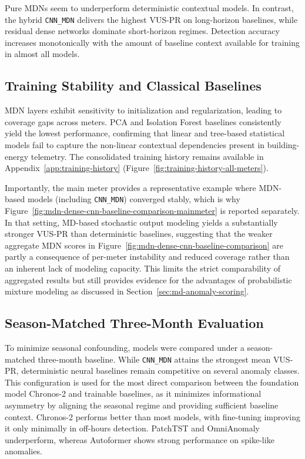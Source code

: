 Pure \ac{MDN}s seem to underperform deterministic contextual models. In
contrast, the hybrid \texttt{CNN\_\allowbreak MDN} delivers the highest \ac{VUS-PR} on
long-horizon baselines, while residual dense networks dominate short-horizon
regimes. Detection accuracy increases monotonically with the amount of baseline
context available for training in almost all models.

\subsection{Training Stability and Classical Baselines}
\label{subsec:training-stability-baselines}

\ac{MDN} layers exhibit sensitivity to initialization and regularization, leading to
coverage gaps across meters. \ac{PCA} and Isolation Forest baselines consistently yield
the lowest performance, confirming that linear and tree-based statistical models fail
to capture the non-linear contextual dependencies present in building-energy
telemetry. The consolidated training history remains available in
Appendix~\ref{app:training-history} (Figure~\ref{fig:training-history-all-meters}).

Importantly, the main meter provides a representative example where \ac{MDN}-based models (including \texttt{CNN\_\allowbreak MDN}) converged stably, which is why Figure~\ref{fig:mdn-dense-cnn-baseline-comparison-mainmeter} is reported separately. In that setting, \ac{MD}-based stochastic output modeling yields a substantially stronger \ac{VUS-PR} than deterministic baselines, suggesting that the weaker aggregate \ac{MDN} scores in Figure~\ref{fig:mdn-dense-cnn-baseline-comparison} are partly a consequence of per-meter instability and reduced coverage rather than an inherent lack of modeling capacity. This limits the strict comparability of aggregated results but still provides evidence for the advantages of probabilistic mixture modeling as discussed in Section~\ref{sec:md-anomaly-scoring}.

\subsection{Season-Matched Three-Month Evaluation}

To minimize seasonal confounding, models were compared under a season-matched
three-month baseline. While \texttt{CNN\_\allowbreak MDN} attains the strongest mean
\ac{VUS-PR}, deterministic neural baselines remain competitive on several anomaly classes.
This configuration is used for the most direct comparison between the foundation model Chronos-2 and trainable baselines, as it minimizes informational asymmetry by aligning the seasonal regime and providing sufficient baseline context.
Chronos-2 performs better than most models, with fine-tuning improving it only minimally in
off-hours detection. PatchTST\parencite{nie2022time} and OmniAnomaly\parencite{su2019robust} underperform, whereas Autoformer\parencite{wu2021autoformer} shows
strong performance on spike-like anomalies.

